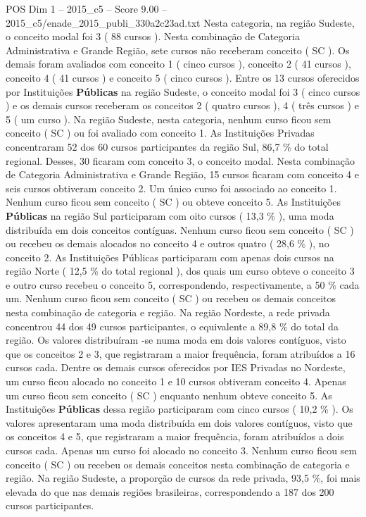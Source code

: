 \begin{textsample}{POS Dim 1 – 2015\_c5 – Score 9.00 – 2015\_c5/enade\_2015\_publi\_330a2c23ad.txt}
Nesta categoria, na região Sudeste, o conceito modal foi 3 ( 88 cursos ).
Nesta combinação de Categoria Administrativa e Grande Região, sete cursos não receberam conceito ( SC ).
Os demais foram avaliados com conceito 1 ( cinco cursos ), conceito 2 ( 41 cursos ), conceito 4 ( 41 cursos ) e conceito 5 ( cinco cursos ).
Entre os 13 cursos oferecidos por Instituições \textbf{Públicas} na região Sudeste, o conceito modal foi 3 ( cinco cursos ) e os demais cursos receberam os conceitos 2 ( quatro cursos ), 4 ( três cursos ) e 5 ( um curso ).
Na região Sudeste, nesta categoria, nenhum curso ficou sem conceito ( SC ) ou foi avaliado com conceito 1.
As Instituições Privadas concentraram 52 dos 60 cursos participantes da região Sul, 86,7 \% do total regional.
Desses, 30 ficaram com conceito 3, o conceito modal.
Nesta combinação de Categoria Administrativa e Grande Região, 15 cursos ficaram com conceito 4 e seis cursos obtiveram conceito 2.
Um único curso foi associado ao conceito 1.
Nenhum curso ficou sem conceito ( SC ) ou obteve conceito 5.
As Instituições \textbf{Públicas} na região Sul participaram com oito cursos ( 13,3 \% ), uma moda distribuída em dois conceitos contíguas.
Nenhum curso ficou sem conceito ( SC ) ou recebeu os demais alocados no conceito 4 e outros quatro ( 28,6 \% ), no conceito 2.
As Instituições Públicas participaram com apenas dois cursos na região Norte ( 12,5 \% do total regional ), dos quais um curso obteve o conceito 3 e outro curso recebeu o conceito 5, correspondendo, respectivamente, a 50 \% cada um.
Nenhum curso ficou sem conceito ( SC ) ou recebeu os demais conceitos nesta combinação de categoria e região.
Na região Nordeste, a rede privada concentrou 44 dos 49 cursos participantes, o equivalente a 89,8 \% do total da região.
Os valores distribuíram -se numa moda em dois valores contíguos, visto que os conceitos 2 e 3, que registraram a maior frequência, foram atribuídos a 16 cursos cada.
Dentre os demais cursos oferecidos por IES Privadas no Nordeste, um curso ficou alocado no conceito 1 e 10 cursos obtiveram conceito 4.
Apenas um curso ficou sem conceito ( SC ) enquanto nenhum obteve conceito 5.
As Instituições \textbf{Públicas} dessa região participaram com cinco cursos ( 10,2 \% ).
Os valores apresentaram uma moda distribuída em dois valores contíguos, visto que os conceitos 4 e 5, que registraram a maior frequência, foram atribuídos a dois cursos cada.
Apenas um curso foi alocado no conceito 3.
Nenhum curso ficou sem conceito ( SC ) ou recebeu os demais conceitos nesta combinação de categoria e região.
Na região Sudeste, a proporção de cursos da rede privada, 93,5 \%, foi mais elevada do que nas demais regiões brasileiras, correspondendo a 187 dos 200 cursos participantes.

\end{textsample}
